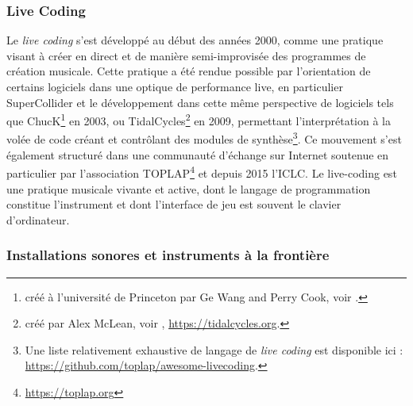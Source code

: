 \subsubsection{Live Coding}

\noindent Le \textit{live coding} s'est développé au début des années 2000, comme une pratique visant à créer en direct et de manière semi-improvisée des programmes de création musicale. Cette pratique a été rendue possible par l'orientation de certains logiciels dans une optique de performance live, en particulier SuperCollider \cite{mccartney_rethinking_2002} et le développement dans cette même perspective de logiciels tels que ChucK\footnote{créé à l'université de Princeton par Ge Wang and Perry Cook, voir \cite{wang_chuck_2003}.} en 2003, ou TidalCycles\footnote{créé par Alex McLean, voir \cite{mclean_tidalpattern_2010}, \url{https://tidalcycles.org}.} en 2009, permettant l'interprétation à la volée de code créant et contrôlant des modules de synthèse\footnote{Une liste relativement exhaustive de langage de \textit{live coding} est disponible ici : \url{https://github.com/toplap/awesome-livecoding}.}. Ce mouvement s'est également structuré dans une communauté d'échange sur Internet soutenue en particulier par l'association TOPLAP\footnote{\url{https://toplap.org}} et depuis 2015 l'\gls{ICLC}. Le live-coding est une pratique musicale vivante et active, dont le langage de programmation constitue l'instrument \cite{blackwell_programming_2005} et dont l'interface de jeu est souvent le clavier d'ordinateur.\\


\subsubsection{Installations sonores et instruments à la frontière}

